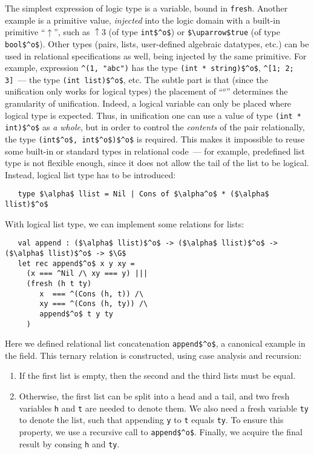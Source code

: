 The simplest expression of logic type is a variable, bound in \lstinline|fresh|. Another example is a primitive value, \emph{injected} into the logic domain with a built-in primitive ``$\uparrow$'', such as $\uparrow\!3$ (of type \lstinline|int$^o$|) or \lstinline|$\uparrow$true| (of type \lstinline|bool$^o$|).
Other types (pairs, lists, user-defined algebraic datatypes, etc.) can be used in relational specifications as well, being injected by the same primitive. For example, expression \lstinline{^(1, "abc")} has the type \lstinline{(int * string)$^o$}, \lstinline{^[1; 2; 3]}~--- the type \lstinline{(int list)$^o$}, etc. The subtle part is that (since the unification only works for logical types) the placement of ``$^o$'' determines the granularity of unification. Indeed, a logical variable can only be placed where logical type is expected. Thus, in unification one can use a value of type \lstinline{(int * int)$^o$} as \emph{a whole}, but in order to control the \emph{contents} of the pair relationally, the type \lstinline{(int$^o$, int$^o$)$^o$} is required. This makes it impossible to reuse some built-in or standard types in relational code~--- for example, predefined list type is not flexible enough, since it does not allow the tail of the list to be logical. Instead, logical list type has to be introduced:

\begin{lstlisting}
   type $\alpha$ llist = Nil | Cons of $\alpha^o$ * ($\alpha$ llist)$^o$
\end{lstlisting}

With logical list type, we can implement some relations for lists:

\begin{lstlisting}
   val append : ($\alpha$ llist)$^o$ -> ($\alpha$ llist)$^o$ -> ($\alpha$ llist)$^o$ -> $\G$
   let rec append$^o$ x y xy =
     (x === ^Nil /\ xy === y) |||
     (fresh (h t ty)
        x  === ^(Cons (h, t)) /\
        xy === ^(Cons (h, ty)) /\
        append$^o$ t y ty
     ) 
\end{lstlisting}

Here we defined relational list concatenation \lstinline{append$^o$}, a canonical example in the field. This ternary relation is constructed,
using case analysis and recursion:

\begin{enumerate}
\item If the first list is empty, then the second and the third lists must be equal.
\item Otherwise, the first list can be split into a head and a tail, and two fresh variables \lstinline{h} and \lstinline{t} are needed to denote them.
We also need a fresh variable \lstinline{ty} to denote the list, such that appending \lstinline{y} to \lstinline{t} equals \lstinline{ty}. To ensure this
property, we use a recursive call to \lstinline{append$^o$}. Finally, we acquire the final result by consing \lstinline{h} and \lstinline{ty}. 
\end{enumerate}


